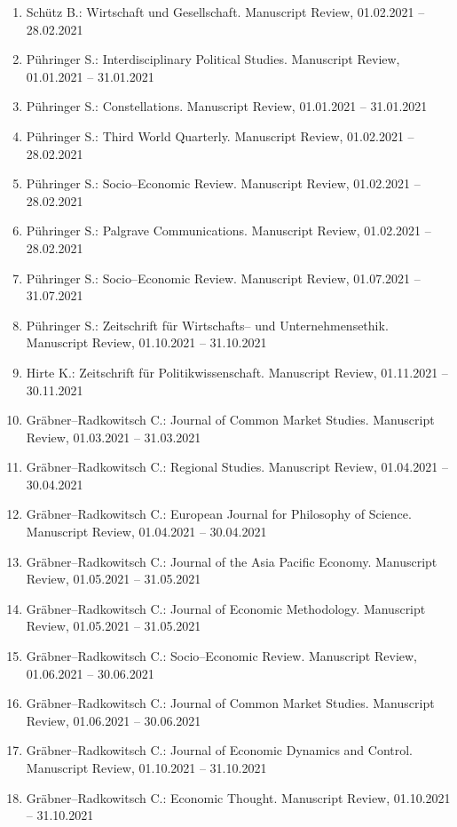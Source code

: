 \begin{enumerate}[leftmargin=*, labelsep=0.5cm]
\item Schütz B.: Wirtschaft und Gesellschaft. Manuscript Review, 01.02.2021 -- 28.02.2021
\item Pühringer S.: Interdisciplinary Political Studies. Manuscript Review, 01.01.2021 -- 31.01.2021
\item Pühringer S.: Constellations. Manuscript Review, 01.01.2021 -- 31.01.2021
\item Pühringer S.: Third World Quarterly. Manuscript Review, 01.02.2021 -- 28.02.2021
\item Pühringer S.: Socio--Economic Review. Manuscript Review, 01.02.2021 -- 28.02.2021
\item Pühringer S.: Palgrave Communications. Manuscript Review, 01.02.2021 -- 28.02.2021
\item Pühringer S.: Socio--Economic Review. Manuscript Review, 01.07.2021 -- 31.07.2021
\item Pühringer S.: Zeitschrift für Wirtschafts-- und Unternehmensethik. Manuscript Review, 01.10.2021 -- 31.10.2021
\item Hirte K.: Zeitschrift für Politikwissenschaft. Manuscript Review, 01.11.2021 -- 30.11.2021
\item Gräbner--Radkowitsch C.: Journal of Common Market Studies. Manuscript Review, 01.03.2021 -- 31.03.2021
\item Gräbner--Radkowitsch C.: Regional Studies. Manuscript Review, 01.04.2021 -- 30.04.2021
\item Gräbner--Radkowitsch C.: European Journal for Philosophy of Science. Manuscript Review, 01.04.2021 -- 30.04.2021
\item Gräbner--Radkowitsch C.: Journal of the Asia Pacific Economy. Manuscript Review, 01.05.2021 -- 31.05.2021
\item Gräbner--Radkowitsch C.: Journal of Economic Methodology. Manuscript Review, 01.05.2021 -- 31.05.2021
\item Gräbner--Radkowitsch C.: Socio--Economic Review. Manuscript Review, 01.06.2021 -- 30.06.2021
\item Gräbner--Radkowitsch C.: Journal of Common Market Studies. Manuscript Review, 01.06.2021 -- 30.06.2021
\item Gräbner--Radkowitsch C.: Journal of Economic Dynamics and Control. Manuscript Review, 01.10.2021 -- 31.10.2021
\item Gräbner--Radkowitsch C.: Economic Thought. Manuscript Review, 01.10.2021 -- 31.10.2021
\end{enumerate}
